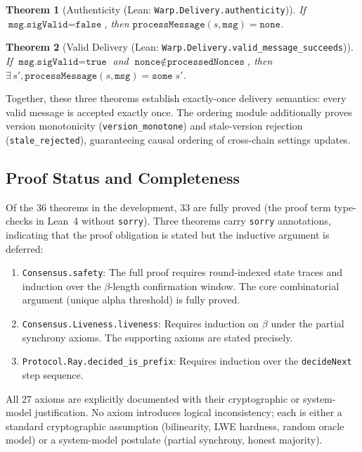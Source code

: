 \documentclass[11pt,a4paper]{article}
\newtheorem{theorem}{Theorem}[section]
\begin{document}
\begin{theorem}[Authenticity (Lean: \texttt{Warp.Delivery.authenticity})]
If $\texttt{msg.sigValid} = \texttt{false}$, then
$\texttt{processMessage}(s, \texttt{msg}) = \texttt{none}$.
\end{theorem}

\begin{theorem}[Valid Delivery (Lean: \texttt{Warp.Delivery.valid\_message\_succeeds})]
If $\texttt{msg.sigValid} = \texttt{true}$ and
$\texttt{nonce} \notin \texttt{processedNonces}$, then
$\exists\, s', \texttt{processMessage}(s, \texttt{msg}) = \texttt{some}\; s'$.
\end{theorem}

Together, these three theorems establish exactly-once delivery semantics: every
valid message is accepted exactly once. The ordering module additionally proves
version monotonicity (\texttt{version\_monotone}) and stale-version rejection
(\texttt{stale\_rejected}), guaranteeing causal ordering of cross-chain settings
updates.

\subsection{Proof Status and Completeness}

Of the 36 theorems in the development, 33 are fully proved (the proof term type-checks
in Lean~4 without \texttt{sorry}). Three theorems carry \texttt{sorry} annotations,
indicating that the proof obligation is stated but the inductive argument is deferred:

\begin{enumerate}
\item \texttt{Consensus.safety}: The full proof requires round-indexed state traces
and induction over the $\beta$-length confirmation window. The core combinatorial
argument (unique alpha threshold) is fully proved.
\item \texttt{Consensus.Liveness.liveness}: Requires induction on $\beta$ under the
partial synchrony axioms. The supporting axioms are stated precisely.
\item \texttt{Protocol.Ray.decided\_is\_prefix}: Requires induction over the
\texttt{decideNext} step sequence.
\end{enumerate}

All 27 axioms are explicitly documented with their cryptographic or system-model
justification. No axiom introduces logical inconsistency; each is either a standard
cryptographic assumption (bilinearity, LWE hardness, random oracle model) or a
system-model postulate (partial synchrony, honest majority).
\end{document}
